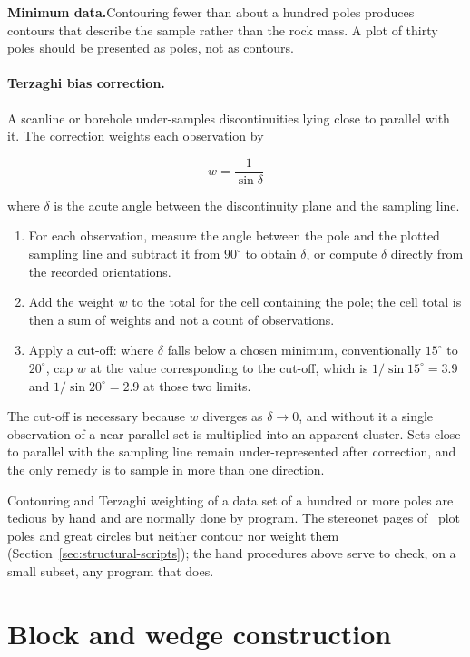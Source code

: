 \noindent\textbf{Minimum data.}\enspace Contouring fewer than about a hundred
poles produces contours that describe the sample rather than the rock mass. A
plot of thirty poles should be presented as poles, not as contours.

\paragraph{Terzaghi bias correction.}
A scanline or borehole under-samples discontinuities lying close to parallel
with it. The correction weights each observation by

\[
w = \frac{1}{\sin\delta}
\]

where $\delta$ is the acute angle between the discontinuity plane and the
sampling line.

\begin{enumerate}
  \item For each observation, measure the angle between the pole and the
        plotted sampling line and subtract it from $90^\circ$ to obtain
        $\delta$, or compute $\delta$ directly from the recorded
        orientations.
  \item Add the weight $w$ to the total for the cell containing the pole;
        the cell total is then a sum of weights and not a count of
        observations.
  \item Apply a cut-off: where $\delta$ falls below a chosen minimum,
        conventionally $15^\circ$ to $20^\circ$, cap $w$ at the value
        corresponding to the cut-off, which is $1/\sin 15^\circ = 3.9$ and
        $1/\sin 20^\circ = 2.9$ at those two limits.
\end{enumerate}

The cut-off is necessary because $w$ diverges as $\delta \to 0$, and without
it a single observation of a near-parallel set is multiplied into an apparent
cluster. Sets close to parallel with the sampling line remain
under-represented after correction, and the only remedy is to sample in more
than one direction.

Contouring and Terzaghi weighting of a data set of a hundred or more poles are
tedious by hand and are normally done by program. The stereonet pages of
\companionname\ plot poles and great circles but neither contour nor weight
them (Section~\ref{sec:structural-scripts}); the hand procedures above serve
to check, on a small subset, any program that does.

\section{Block and wedge construction}
\label{sec:block-and-wedge-construction}

